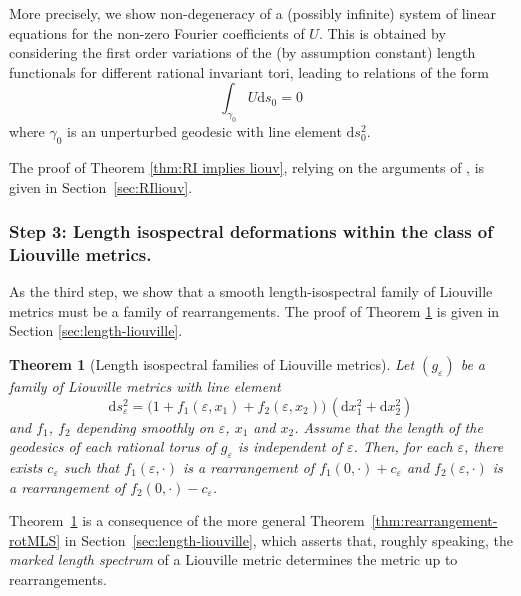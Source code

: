 \documentclass[11pt,letterpaper,oneside]{amsart}
\renewcommand{\epsilon}{\varepsilon}
\newtheorem{theo}{Theorem}[section]
\theoremstyle{definition}
\theoremstyle{remark}
\theoremstyle{definition}
\theoremstyle{remark}
\newcommand{\dif}{\mathrm{d}}
\begin{document}
More precisely, we show non-degeneracy of a (possibly infinite) system of linear equations for the non-zero Fourier coefficients of $U$. This is obtained by considering the first order variations of the (by assumption constant) length functionals for different rational invariant tori, leading to relations of the form
\begin{equation*}
    \int_{\gamma_0} U \dif s_0 = 0
\end{equation*}
where $\gamma_0$ is an unperturbed geodesic with line element $\dif s_0^2$.

\medskip

The proof of Theorem \ref{thm:RI implies liouv}, relying on the arguments of \cite{henheik2025deformational}, is given in Section~\ref{sec:RIliouv}. 

\subsubsection*{Step 3: Length isospectral deformations within the class of Liouville metrics.} As the third step, we show that a smooth length-isospectral family of Liouville metrics must be a family of rearrangements. The proof of Theorem \ref{thm:liourearrange} is given in Section \ref{sec:length-liouville}. 

\begin{theo}[Length isospectral families of Liouville metrics] \label{thm:liourearrange}
    Let $(g_\epsilon)$ be a family of Liouville metrics with line element
\begin{equation}
    \dif s_\epsilon^2
= \bigl(1+f_1(\epsilon, x_1)+f_2(\epsilon, x_2)\bigr)\,(\dif x_1^2+\dif x_2^2)
\end{equation}
    and $f_1$, $f_2$ depending smoothly on $\epsilon$, $x_1$ and $x_2$. 
    Assume that the length of the geodesics of each rational torus of $g_\epsilon$ is independent of $\epsilon$. Then, for each $\epsilon$, there exists $c_\epsilon$ such that $f_1(\epsilon, \cdot)$ is a rearrangement of $f_1(0, \cdot) + c_\epsilon$ and $f_2(\epsilon, \cdot)$ is a rearrangement of $f_2(0, \cdot) - c_\epsilon$. 
\end{theo}

Theorem~\ref{thm:liourearrange} is a consequence of the more general Theorem~\ref{thm:rearrangement-rotMLS} in Section~\ref{sec:length-liouville}, which asserts that, roughly speaking, the \emph{marked length spectrum} of a Liouville metric determines the metric up to rearrangements.

\medskip
\end{document}
